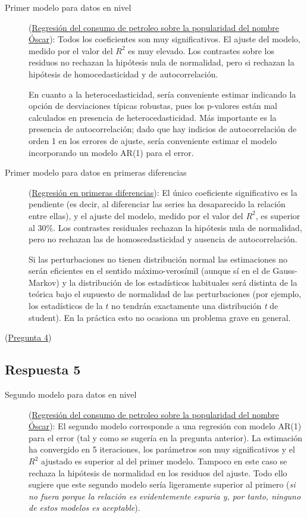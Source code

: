 \documentclass[10pt]{article}
\begin{document}
\begin{description}
\item[{Primer modelo para datos en nivel}] (\hyperref[sec:orgacc1102]{Regresión del consumo de petroleo sobre la popularidad del nombre Óscar}): Todos los
coeficientes son muy significativos. El ajuste del modelo, medido
por el valor del \(R^2\) es muy elevado. Los contrastes sobre los
residuos no rechazan la hipótesis nula de normalidad, pero si
rechazan la hipótesis de homocedasticidad y de autocorrelación.

En cuanto a la heterocedasticidad, sería conveniente estimar
indicando la opción de desviaciones típicas robustas, pues los
p-valores están mal calculados en presencia de
heterocedasticidad. Más importante es la presencia de
autocorrelación; dado que hay indicios de autocorrelación de orden 1
en los errores de ajuste, sería conveniente estimar el modelo
incorporando un modelo AR(1) para el error.

\item[{Primer modelo para datos en primeras diferencias}] (\hyperref[sec:org5b16206]{Regresión en primeras diferencias}): El único coeficiente significativo es la
pendiente (es decir, al diferenciar las series ha desaparecido la
relación entre ellas), y el ajuste del modelo, medido por el valor
del \(R^2\), es superior al 30\%. Los contrastes residuales rechazan
la hipótesis nula de normalidad, pero no rechazan las de
homoscedasticidad y ausencia de autocorrelación.

Si las perturbaciones no tienen distribución normal las estimaciones
no serán eficientes en el sentido máximo-verosímil (aunque sí en el
de Gauss-Markov) y la distribución de los estadísticos habituales
será distinta de la teórica bajo el supuesto de normalidad de las
perturbaciones (por ejemplo, los estadísticos de la \(t\) no tendrán
exactamente una distribución \emph{t} de student). En la práctica esto no
ocasiona un problema grave en general.
\end{description}

(\hyperref[sec:org4ace36f]{Pregunta 4})
\subsection*{Respuesta 5}
\label{sec:org2599647}


\begin{description}
\item[{Segundo modelo para datos en nivel}] (\hyperref[sec:orgacc1102]{Regresión del consumo de petroleo sobre la popularidad del nombre Óscar}): El segundo modelo
corresponde a una regresión con modelo AR(1) para el error (tal y
como se sugería en la pregunta anterior). La estimación ha
convergido en 5 iteraciones, los parámetros son muy significativos y
el \(R^2\) ajustado es superior al del primer modelo. Tampoco en este
caso se rechaza la hipótesis de normalidad en los residuos del
ajuste. Todo ello sugiere que este segundo modelo sería ligeramente
superior al primero (\emph{si no fuera porque la relación es
evidentemente espuria y, por tanto, ninguno de estos modelos es
aceptable}).
\end{description}
\end{document}

